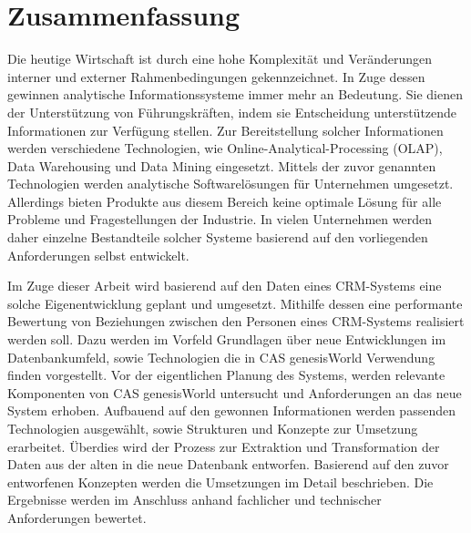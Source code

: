 
\chapter*{\centering Zusammenfassung}

Die heutige Wirtschaft ist durch eine hohe Komplexität und Veränderungen interner und externer Rahmenbedingungen gekennzeichnet. In Zuge dessen gewinnen analytische Informationssysteme immer mehr an Bedeutung. Sie dienen der Unterstützung von Führungskräften, indem sie Entscheidung unterstützende Informationen zur Verfügung stellen. Zur Bereitstellung solcher Informationen werden verschiedene Technologien, wie Online-Analytical-Processing (OLAP), Data Warehousing und Data Mining eingesetzt. Mittels der zuvor genannten Technologien werden analytische Softwarelösungen für Unternehmen umgesetzt. Allerdings bieten Produkte aus diesem Bereich keine optimale Lösung für alle Probleme und Fragestellungen der Industrie. In vielen Unternehmen werden daher einzelne Bestandteile solcher Systeme basierend auf den vorliegenden Anforderungen selbst entwickelt.

Im Zuge dieser Arbeit wird basierend auf den Daten eines CRM-Systems eine solche Eigenentwicklung geplant und umgesetzt. Mithilfe dessen eine performante Bewertung von Beziehungen zwischen den Personen eines CRM-Systems realisiert werden soll. Dazu werden im Vorfeld Grundlagen über neue Entwicklungen im Datenbankumfeld, sowie Technologien die in CAS genesisWorld Verwendung finden vorgestellt. Vor der eigentlichen Planung des Systems, werden relevante Komponenten von CAS genesisWorld untersucht und Anforderungen an das neue System erhoben. Aufbauend auf den gewonnen Informationen  werden passenden Technologien ausgewählt, sowie Strukturen und Konzepte zur Umsetzung erarbeitet. Überdies wird der Prozess zur Extraktion und Transformation der Daten aus der alten in die neue Datenbank entworfen. Basierend auf den zuvor entworfenen Konzepten werden die Umsetzungen im Detail beschrieben. Die Ergebnisse werden im Anschluss anhand fachlicher und technischer Anforderungen bewertet.